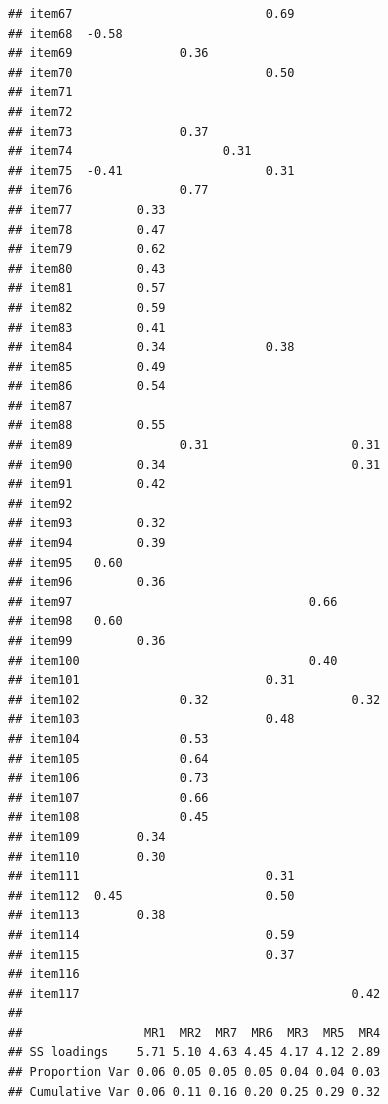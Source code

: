 \documentclass[
  english,
  man]{apa6}
\begin{document}
\begin{verbatim}
## item67                           0.69            
## item68  -0.58                                    
## item69               0.36                        
## item70                           0.50            
## item71                                           
## item72                                           
## item73               0.37                        
## item74                     0.31                  
## item75  -0.41                    0.31            
## item76               0.77                        
## item77         0.33                              
## item78         0.47                              
## item79         0.62                              
## item80         0.43                              
## item81         0.57                              
## item82         0.59                              
## item83         0.41                              
## item84         0.34              0.38            
## item85         0.49                              
## item86         0.54                              
## item87                                           
## item88         0.55                              
## item89               0.31                    0.31
## item90         0.34                          0.31
## item91         0.42                              
## item92                                           
## item93         0.32                              
## item94         0.39                              
## item95   0.60                                    
## item96         0.36                              
## item97                                 0.66      
## item98   0.60                                    
## item99         0.36                              
## item100                                0.40      
## item101                          0.31            
## item102              0.32                    0.32
## item103                          0.48            
## item104              0.53                        
## item105              0.64                        
## item106              0.73                        
## item107              0.66                        
## item108              0.45                        
## item109        0.34                              
## item110        0.30                              
## item111                          0.31            
## item112  0.45                    0.50            
## item113        0.38                              
## item114                          0.59            
## item115                          0.37            
## item116                                          
## item117                                      0.42
## 
##                 MR1  MR2  MR7  MR6  MR3  MR5  MR4
## SS loadings    5.71 5.10 4.63 4.45 4.17 4.12 2.89
## Proportion Var 0.06 0.05 0.05 0.05 0.04 0.04 0.03
## Cumulative Var 0.06 0.11 0.16 0.20 0.25 0.29 0.32
\end{verbatim}
\end{document}
